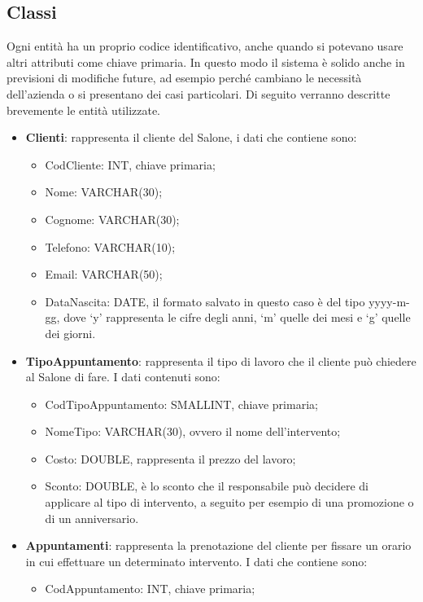 {	\subsection{Classi}{
		Ogni entità ha un proprio codice identificativo, anche quando si potevano usare altri attributi come chiave primaria. In questo modo il sistema è solido anche in previsioni di modifiche future, ad esempio perché cambiano le necessità dell'azienda o si presentano dei casi particolari. Di seguito verranno descritte brevemente le entità utilizzate.
			\begin{itemize}\itemsep1pt
				\item \textbf{Clienti}: rappresenta il cliente del Salone, i dati che contiene sono:
					\begin{itemize}\itemsep1pt
						\item CodCliente: INT, chiave primaria;
						\item Nome: VARCHAR(30);
						\item Cognome: VARCHAR(30);
						\item Telefono: VARCHAR(10);
						\item Email: VARCHAR(50);
						\item DataNascita: DATE, il formato salvato in questo caso è del tipo yyyy-m-gg, dove `y' rappresenta le cifre degli anni, `m' quelle dei mesi e `g' quelle dei giorni.
					\end{itemize}
				\item \textbf{TipoAppuntamento}: rappresenta il tipo di lavoro che il cliente può chiedere al Salone di fare. I dati contenuti sono:
					\begin{itemize}\itemsep1pt
						\item CodTipoAppuntamento: SMALLINT, chiave primaria;
						\item NomeTipo: VARCHAR(30), ovvero il nome dell'intervento;
						\item Costo: DOUBLE, rappresenta il prezzo del lavoro;
						\item Sconto: DOUBLE, è lo sconto che il responsabile può decidere di applicare al tipo di intervento, a seguito per esempio di una promozione o di un anniversario. 
					\end{itemize}
				\item \textbf{Appuntamenti}: rappresenta la prenotazione del cliente per fissare un orario in cui effettuare un determinato intervento. I dati che contiene sono:
					\begin{itemize}\itemsep1pt
						\item CodAppuntamento: INT, chiave primaria;

\end{itemize}
\end{itemize}}}
